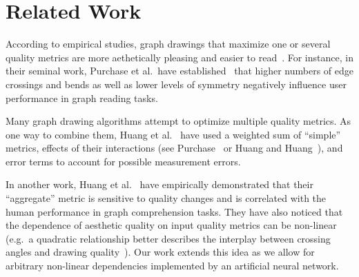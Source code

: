 
%

\section{Related Work}
\label{sec:relwork}

According to empirical studies, graph drawings that maximize one or several quality metrics are more aethetically
pleasing and easier to read~\cite{HuangE05,Huang2013,Purchase97,PurchaseHNK12,WarePCM02}.  For instance, in their
seminal work, Purchase et al.~have established~\cite{PurchaseCM96} that higher numbers of edge crossings and bends as
well as lower levels of symmetry negatively influence user performance in graph reading tasks.

Many graph drawing algorithms attempt to optimize multiple quality metrics.  As one way to combine them, Huang et
al.~\cite{Huang2013} have used a weighted sum of \enquote{simple} metrics, effects of their interactions (see
Purchase~\cite{PURCHASE98} or Huang and Huang~\cite{Huang10}), and error terms to account for possible measurement
errors.

In another work, Huang et al.~\cite{HuangHL16} have empirically demonstrated that their \enquote{aggregate} metric is
sensitive to quality changes and is correlated with the human performance in graph comprehension tasks.  They have also
noticed that the dependence of aesthetic quality on input quality metrics can be non-linear (e.g.~a quadratic
relationship better describes the interplay between crossing angles and drawing quality~\cite{HuangHE08}).  Our work
extends this idea as we allow for arbitrary non-linear dependencies implemented by an artificial neural network.


